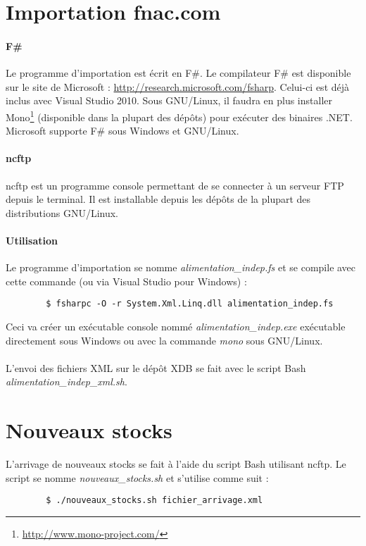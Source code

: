 \documentclass[a4paper,12pt,french]{article}
\begin{document}
\section{Importation fnac.com}

    \paragraph{F\#}
    Le programme d'importation est écrit en F\#. Le compilateur F\# est
disponible sur le site de Microsoft :
\url{http://research.microsoft.com/fsharp}. Celui-ci est déjà inclus avec
Visual Studio 2010. Sous GNU/Linux, il faudra en plus installer
Mono\footnote{\url{http://www.mono-project.com/}} (disponible dans la plupart
des dépôts) pour exécuter des binaires .NET. Microsoft supporte F\# sous Windows
et GNU/Linux.

    \paragraph{ncftp}
    ncftp est un programme console permettant de se connecter à un serveur FTP
depuis le terminal. Il est installable depuis les dépôts de la plupart des
distributions GNU/Linux.

    \paragraph{Utilisation}
    Le programme d'importation se nomme \textit{alimentation\_indep.fs} et se
compile avec cette commande (ou via Visual Studio pour Windows) :
    \begin{lstlisting}
        $ fsharpc -O -r System.Xml.Linq.dll alimentation_indep.fs
    \end{lstlisting}
    Ceci va créer un exécutable console nommé \textit{alimentation\_indep.exe}
exécutable directement sous Windows ou avec la commande \textit{mono} sous
GNU/Linux.

    \paragraph{}
    L'envoi des fichiers XML sur le dépôt XDB se fait avec le script Bash
\textit{alimentation\_indep\_xml.sh}.

\section{Nouveaux stocks}
    
    L'arrivage de nouveaux stocks se fait à l'aide du script Bash utilisant
ncftp. Le script se nomme \textit{nouveaux\_stocks.sh} et s'utilise comme suit :
    \begin{lstlisting}
        $ ./nouveaux_stocks.sh fichier_arrivage.xml
    \end{lstlisting}
\end{document}
